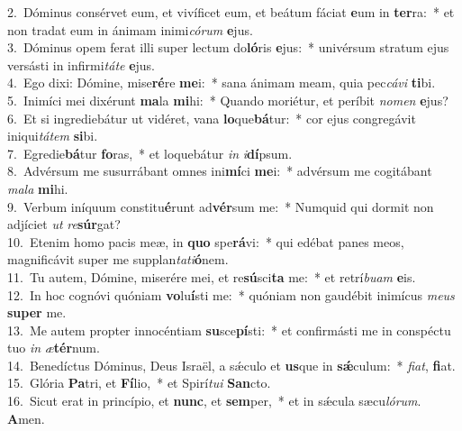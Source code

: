 {2.~}Dóminus consérvet eum, et vivíficet eum, et beátum fáciat \textbf{e}um in \textbf{ter}ra:~* et non tradat eum in ánimam inimi\textit{có}\textit{rum} \textbf{e}jus.\\
{3.~}Dóminus opem ferat illi super lectum do\textbf{ló}ris \textbf{e}jus:~* univérsum stratum ejus versásti in infirmi\textit{tá}\textit{te} \textbf{e}jus.\\
{4.~}Ego dixi: Dómine, mise\textbf{ré}re \textbf{me}i:~* sana ánimam meam, quia pec\textit{cá}\textit{vi} \textbf{ti}bi.\\
{5.~}Inimíci mei dixérunt \textbf{ma}la \textbf{mi}hi:~* Quando moriétur, et períbit \textit{no}\textit{men} \textbf{e}jus?\\
{6.~}Et si ingrediebátur ut vidéret, vana \textbf{lo}que\textbf{bá}tur:~* cor ejus congregávit iniqui\textit{tá}\textit{tem} \textbf{si}bi.\\
{7.~}Egredie\textbf{bá}tur \textbf{fo}ras,~* et loquebátur \textit{in} \textit{i}\textbf{dí}psum.\\
{8.~}Advérsum me susurrábant omnes ini\textbf{mí}ci \textbf{me}i:~* advérsum me cogitábant \textit{ma}\textit{la} \textbf{mi}hi.\\
{9.~}Verbum iníquum constitu\textbf{é}runt ad\textbf{vér}sum me:~* Numquid qui dormit non adjíciet \textit{ut} \textit{re}\textbf{súr}gat?\\
{10.~}Etenim homo pacis meæ, in \textbf{quo} spe\textbf{rá}vi:~* qui edébat panes meos, magnificávit super me supplan\textit{ta}\textit{ti}\textbf{ó}nem.\\
{11.~}Tu autem, Dómine, miserére mei, et re\textbf{sú}sci\textbf{ta} me:~* et retrí\textit{bu}\textit{am} \textbf{e}is.\\
{12.~}In hoc cognóvi quóniam \textbf{vo}lu\textbf{í}sti me:~* quóniam non gaudébit inimícus \textit{me}\textit{us} \textbf{su}\textbf{per} me.\\
{13.~}Me autem propter innocéntiam \textbf{su}sce\textbf{pí}sti:~* et confirmásti me in conspéctu tuo \textit{in} \textit{æ}\textbf{tér}num.\\
{14.~}Benedíctus Dóminus, Deus Israël, a sǽculo et \textbf{us}que in \textbf{sǽ}culum:~* \textit{fi}\textit{at}, \textbf{fi}at.\\
{15.~}Glória \textbf{Pa}tri, et \textbf{Fí}lio,~* et Spirí\textit{tu}\textit{i} \textbf{San}cto.\\
{16.~}Sicut erat in princípio, et \textbf{nunc}, et \textbf{sem}per,~* et in sǽcula sæcu\textit{ló}\textit{rum}. \textbf{A}men.\\

